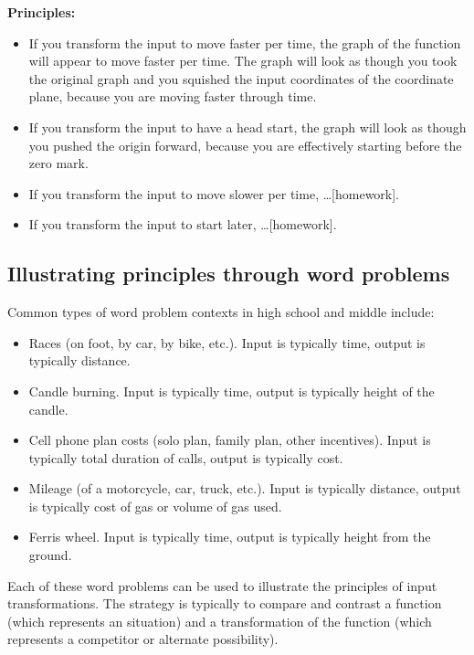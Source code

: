 \documentclass[11pt]{article}
\theoremstyle{definition}
\begin{document}
{\bf Principles:} 
	\begin{itemize}
	\item If you transform the input to move faster per time, the graph of the function will appear to move faster per time. The graph will look as though you took the original graph and you squished the input coordinates of the coordinate plane, because you are moving faster through time. 
	\item If you transform the input to have a head start, the graph will look as though you pushed the origin forward, because you are effectively starting before the zero mark.
	\item If you transform the input to move slower per time, \dots [homework].
	\item If you transform the input to start later, \dots [homework].
	\end{itemize}

\subsection{Illustrating principles through word problems}
\label{section: transformation principles}

Common types of word problem contexts in high school and middle include:
	\begin{itemize}
	\item Races (on foot, by car, by bike, etc.). Input is typically time, output is typically distance. 
	\item Candle burning. Input is typically time, output is typically height of the candle. 
	\item Cell phone plan costs (solo plan, family plan, other incentives). Input is typically total duration of calls, output is typically cost.
	\item Mileage (of a motorcycle, car, truck, etc.). Input is typically distance, output is typically cost of gas or volume of gas used.
	\item Ferris wheel. Input is typically time, output is typically height from the ground.
	\end{itemize}

Each of these word problems can be used to illustrate the principles of input transformations. The strategy is typically to compare and contrast a function (which represents an situation) and a transformation of the function (which represents a competitor or alternate possibility).  

\bigskip
\end{document}
